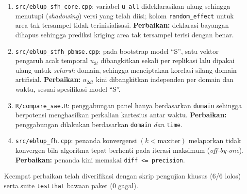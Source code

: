 \documentclass[11pt,a4paper]{article}
\theoremstyle{definition}
\begin{document}
\begin{enumerate}[nosep]
  \item \texttt{src/eblup\_sfh\_core.cpp}: variabel \texttt{u\_all} dideklarasikan
    ulang sehingga menutupi (\emph{shadowing}) versi yang telah diisi; kolom
    \texttt{random\_effect} untuk area tak tersampel tidak terinisialisasi.
    \textbf{Perbaikan:} deklarasi bayangan dihapus sehingga prediksi kriging
    area tak tersampel terisi dengan benar.
  \item \texttt{src/eblup\_stfh\_pbmse.cpp}: pada bootstrap model ``S'',
    satu vektor pengaruh acak temporal $u_{2t}$ dibangkitkan sekali per replikasi
    lalu dipakai ulang untuk \emph{seluruh} domain, sehingga menciptakan korelasi
    silang-domain artifisial. \textbf{Perbaikan:} $u_{2dt}$ kini dibangkitkan
    independen per domain dan waktu, sesuai spesifikasi model ``S''.
  \item \texttt{R/compare\_sae.R}: penggabungan panel hanya berdasarkan
    \texttt{domain} sehingga berpotensi menghasilkan perkalian kartesius antar
    waktu. \textbf{Perbaikan:} penggabungan dilakukan berdasarkan
    \texttt{domain} \emph{dan} \texttt{time}.
  \item \texttt{src/eblup\_fh.cpp}: penanda konvergensi $(k < \text{maxiter})$
    melaporkan tidak konvergen bila algoritma tepat berhenti pada iterasi
    maksimum (\emph{off-by-one}). \textbf{Perbaikan:} penanda kini memakai
    \texttt{diff <= precision}.
\end{enumerate}
Keempat perbaikan telah diverifikasi dengan skrip pengujian khusus (6/6 lolos)
serta suite \texttt{testthat} bawaan paket (0 gagal).
\end{document}
